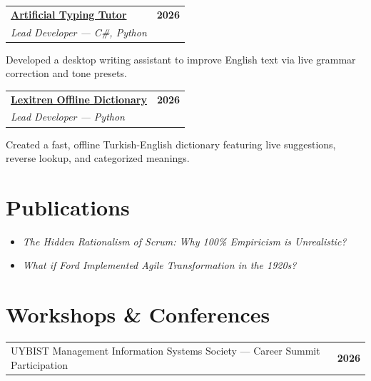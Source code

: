 \documentclass[a4paper,12pt]{article}
\begin{document}
\vspace{10pt}

\begin{tabularx}{\linewidth}{@{}X r@{}}
\underline{\textbf{Artificial Typing Tutor}} & \textbf{2026} \\
\textit{Lead Developer --- C\#, Python} & \\
\end{tabularx}
\vspace{-16pt}

{\footnotesize\color{black!60} Developed a desktop writing assistant to improve English text via live grammar correction and tone presets.}

\vspace{10pt}

\begin{tabularx}{\linewidth}{@{}X r@{}}
\underline{\textbf{Lexitren Offline Dictionary}} & \textbf{2026} \\
\textit{Lead Developer --- Python} & \\
\end{tabularx}
\vspace{-16pt}

{\footnotesize\color{black!60} Created a fast, offline Turkish-English dictionary featuring live suggestions, reverse lookup, and categorized meanings.}

\section{Publications}
\begin{itemize}[nosep,after=\strut, leftmargin=1.5em, itemsep=6pt,label=\textbullet]
    \item \textit{The Hidden Rationalism of Scrum: Why 100\% Empiricism is Unrealistic?}
    \item \textit{What if Ford Implemented Agile Transformation in the 1920s?}
\end{itemize}

\section{Workshops \& Conferences}
\begin{tabularx}{\linewidth}{@{}X r@{}}
UYBIST Management Information Systems Society --- Career Summit Participation & \textbf{2026} \\
\end{tabularx}
\end{document}
